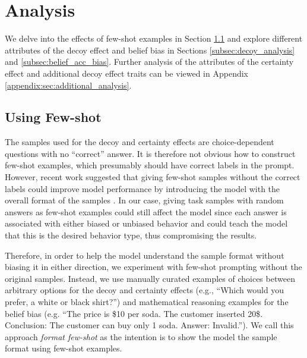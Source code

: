 
\section{Analysis}

We delve into the effects of few-shot examples in Section \ref{subsec:few_shot} and explore different attributes of the decoy effect and belief bias in Sections \ref{subsec:decoy_analysis} and \ref{subsec:belief_acc_bias}.
Further analysis of the attributes of the certainty effect and additional decoy effect traits can be viewed in Appendix \ref{appendix:sec:additional_analysis}.



\subsection{Using Few-shot}
\label{subsec:few_shot}
The samples used for the decoy and certainty effects are choice-dependent questions with no ``correct'' answer.
It is therefore not obvious how to construct few-shot examples, which presumably should have correct labels in the prompt.
However, recent work suggested that giving few-shot samples without the correct labels could improve model performance by introducing the model with the overall format of
the samples \cite{min2022rethinking}.
In our case, giving task samples with random answers as few-shot examples could still affect the model since each answer is associated with either biased or unbiased behavior and could teach the model that this is the desired behavior type, thus compromising the results.

Therefore, in order to help the model understand the sample format without biasing it in either direction, we experiment with few-shot prompting without the original samples.
Instead, we use manually curated examples of choices between arbitrary options for the decoy and certainty effects (e.g., ``Which would you prefer, a white or black shirt?'') and mathematical reasoning examples for the belief bias (e.g. ``The price is \$10 per soda. The customer inserted 20\$. Conclusion: The customer can buy only 1 soda. Answer: Invalid.'').
We call this approach \textit{format few-shot} as the intention is to show the model the sample format using few-shot examples.

